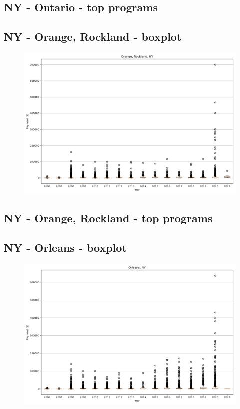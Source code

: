 \subsection*{NY - Ontario - top programs}

\newpage
\subsection*{NY - Orange, Rockland - boxplot}
\begin{figure}[h]
\centering
\includegraphics[width=7in]{../output/boxplots/counties/Orange, Rockland-NY_boxplot.png}
\end{figure}


\subsection*{NY - Orange, Rockland - top programs}

\newpage
\subsection*{NY - Orleans - boxplot}
\begin{figure}[h]
\centering
\includegraphics[width=7in]{../output/boxplots/counties/Orleans-NY_boxplot.png}
\end{figure}


